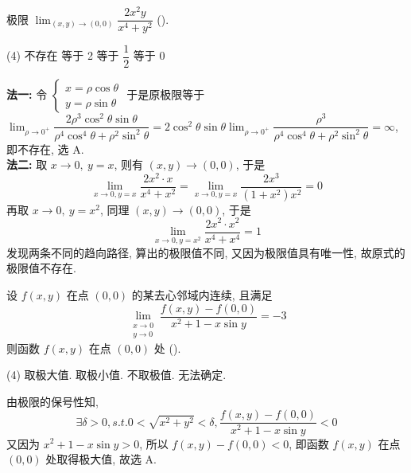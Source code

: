 \begin{example}
    极限 $\displaystyle\lim_{(x,y)\to(0,0)}\dfrac{2x^2y}{x^4+y^2}$ (\quad).
    \begin{tasks}(4)
        \task 不存在
        \task 等于 2
        \task 等于 $\dfrac{1}{2}$
        \task 等于 0
    \end{tasks}
\end{example}
\begin{solution}
    \textbf{法一: }令 $\begin{cases}
            x=\rho\cos\theta \\y=\rho\sin\theta
        \end{cases}$
    于是原极限等于 $\displaystyle\lim_{\rho\to0^+}\dfrac{2\rho^3\cos^2\theta\sin\theta }{\rho^4\cos^4\theta+\rho^2\sin^2\theta}=2\cos^2\theta\sin\theta\lim_{\rho\to0^+}\dfrac{\rho^3}{\rho^4\cos^4\theta+\rho^2\sin^2\theta}=\infty$, 即不存在, 选 A.\\
    \textbf{法二: }取 $x\to0,~y=x$, 则有 $(x,y)\to(0,0)$, 于是 $$\displaystyle\lim_{x\to0,y=x}\dfrac{2x^2\cdot x}{x^4+x^2}=\lim_{x\to0,y=x}\dfrac{2x^3}{(1+x^2)x^2}=0$$
    再取 $x\to0,~y=x^2$, 同理 $(x,y)\to(0,0)$, 于是 $$\displaystyle\lim_{x\to0,y=x^2}\dfrac{2x^2\cdot x^2}{x^4+x^4}=1$$
    发现两条不同的趋向路径, 算出的极限值不同, 又因为极限值具有唯一性, 故原式的极限值不存在.
\end{solution}

\begin{example}
    设 $f(x,y)$ 在点 $(0,0)$ 的某去心邻域内连续, 且满足 $$
    \lim_{\substack{x\to0 \\ y\to0}}\dfrac{f(x,y)-f(0,0)}{x^2+1-x\sin y}=-3
    $$
    则函数 $f(x,y)$ 在点 $(0,0)$ 处 (\quad).
    \begin{tasks}(4)
        \task 取极大值.
        \task 取极小值.
        \task 不取极值.
        \task 无法确定.
    \end{tasks}
\end{example}
\begin{solution}
    由极限的保号性知, $$\exists\delta>0,s.t.0<\sqrt{x^2+y^2}<\delta,\dfrac{f(x,y)-f(0,0)}{x^2+1-x\sin y}<0$$
    又因为 $x^2+1-x\sin y>0$, 所以 $f(x,y)-f(0,0)<0$, 即函数 $f(x,y)$ 在点 $(0,0)$  处取得极大值, 故选 A.
\end{solution}

%     

